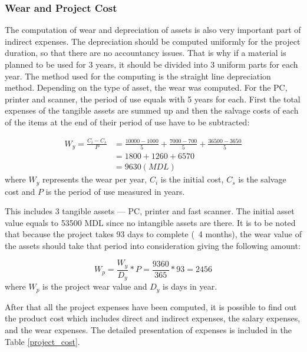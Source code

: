 \subsubsection{Wear and Project Cost}
The computation of wear and depreciation of assets is also very important part of indirect expenses. The depreciation should be computed uniformly for the project duration, so that there are no accountancy issues. That is why  if a material is planned to be used for 3 years, it should be divided into 3 uniform parts for each year. The method used for the computing is the straight line depreciation method. Depending on the type of asset, the wear was computed. For the PC, printer and scanner, the period of use equals with 5 years for each. First the total expenses of the tangible assets are summed up and then the salvage costs of each of the items at the end of their period of use have to be subtracted:

\begin{align}
  W_{y} = \frac{C_{i}-C_{s}}{P} &= \frac{10000-1000}{5} + \frac{7000 - 700}{5} + \frac{36500 - 3650}{5} \nonumber \\
  &= 1800 + 1260 + 6570 \nonumber \\
  &= 9630(MDL) \label{4.6}
\end{align}
where $W_{y}$ represents the wear per year, $C_{i}$ is the initial cost, $C_{s}$ is the salvage cost and $P$ is the period of use measured in years. 

This includes 3 tangible assets — PC, printer and fast scanner. The initial asset value equals to 53500 MDL since no intangible assets are there. It is to be noted that because the project takes 93 days to complete (~4 months), the wear value of the assets should take that period into consideration giving the following amount:

\begin{equation}
  W_{p} = \frac{W_{y}}{D_{y}} * P = \frac{9360}{365} * 93 = 2456 \label{4.7}
\end{equation}
where $W_{p}$ is the project wear value and $D_{y}$ is days in year.

After that all the project expenses have been computed, it is possible to find out the product cost which includes direct and indirect expenses, the salary expenses, and the wear expenses. The detailed presentation of expenses is included in the Table \ref{project_cost}. 

